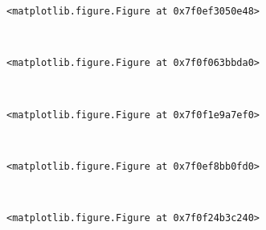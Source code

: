 \documentclass[11pt]{article}
\begin{document}
    
    \begin{verbatim}
<matplotlib.figure.Figure at 0x7f0ef3050e48>
    \end{verbatim}

    
    \begin{center}
    \end{center}
    { \hspace*{\fill} \\}
    
    
    \begin{verbatim}
<matplotlib.figure.Figure at 0x7f0f063bbda0>
    \end{verbatim}

    
    \begin{center}
    \end{center}
    { \hspace*{\fill} \\}
    
    
    \begin{verbatim}
<matplotlib.figure.Figure at 0x7f0f1e9a7ef0>
    \end{verbatim}

    
    \begin{center}
    \end{center}
    { \hspace*{\fill} \\}
    
    
    \begin{verbatim}
<matplotlib.figure.Figure at 0x7f0ef8bb0fd0>
    \end{verbatim}

    
    \begin{center}
    \end{center}
    { \hspace*{\fill} \\}
    
    
    \begin{verbatim}
<matplotlib.figure.Figure at 0x7f0f24b3c240>
    \end{verbatim}

    
    \begin{center}
    \end{center}
    { \hspace*{\fill} \\}
    
\end{document}
